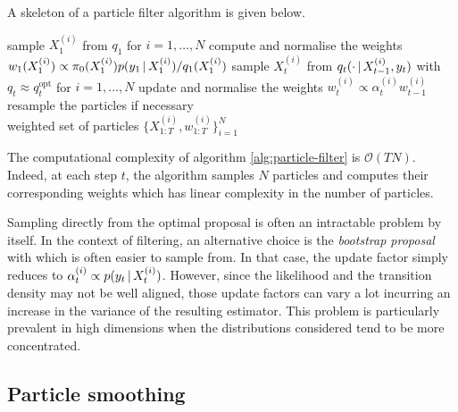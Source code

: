 A skeleton of a particle filter algorithm is given below.
%
\begin{algorithm}[!h]\small
	\caption{\label{alg:particle-filter}}
	\begin{algorithmic}[1]
		\State sample $X_{1}^{(i)}$ from $ q_{1}$ for $i=1,\dots,N$	%
		\State compute and normalise the weights $w_{1}(X^{(i)}_{1})\propto {\pi_{0}( X^{(i)}_{1})p(y_{1}\,|\,X^{(i)}_{1})/ q_{1}(X^{(i)}_{1})}$
			\State sample $X^{(i)}_{t}$ from $ q_{t}( \cdot \,|\, X^{(i)}_{t-1}, y_{t})$ with $q_{t}\approx q_{t}^{\text{opt}}$ for $i=1,\dots,N$
			\State update and normalise the weights $w^{(i)}_{t}\propto\alpha^{(i)}_{t}w^{(i)}_{t-1}$
			\State resample the particles if necessary
		\EndFor\\
		\Return weighted set of particles $\{X^{(i)}_{1:T},w^{(i)}_{1:T}\}_{i=1}^{N}$
	\end{algorithmic}
\end{algorithm}
%

The computational complexity of algorithm \ref{alg:particle-filter} is $\mathcal O(TN)$. Indeed, at each step $t$,  the algorithm samples $N$ particles and computes their corresponding weights which has linear complexity in the number of particles.

Sampling directly from the optimal proposal is often an intractable problem by itself. In the context of filtering, an alternative choice is the \emph{bootstrap proposal} \citep{doucet11} with
which is often easier to sample from. In that case, the update factor simply reduces to $\alpha^{(i)}_t \propto p(y_t\,|\, X^{(i)}_t)$. However, since the likelihood and the transition density may not be well aligned, those update factors can vary a lot incurring an increase in the variance of the resulting estimator.
This problem is particularly prevalent in high dimensions when the distributions considered tend to be more concentrated.


\subsection{\label{bg:particle-smoothing}Particle smoothing}

